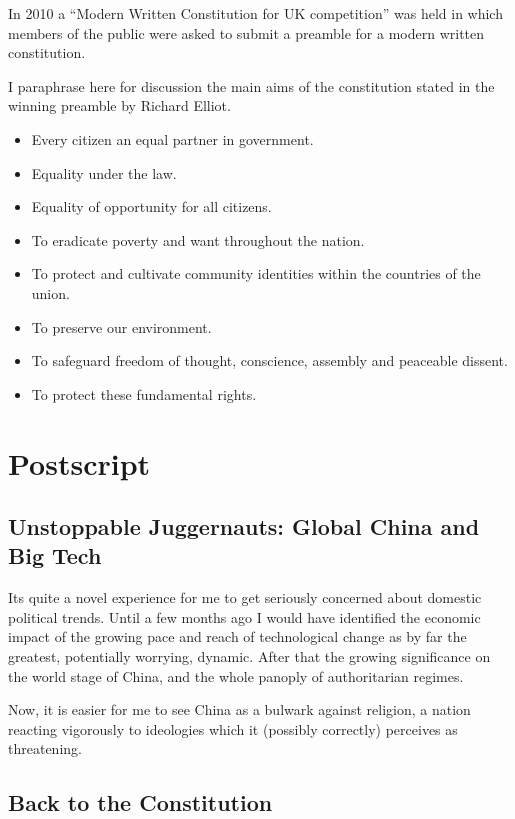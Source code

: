 \documentclass[14pt,titlepage]{extarticle}
\begin{document}
In 2010 a ``Modern Written Constitution for UK competition'' was held in which members of the public were asked to submit a preamble for a modern written constitution.

I paraphrase here for discussion the main aims of the constitution stated in the winning preamble by Richard Elliot.

\begin{itemize}
\item Every citizen an equal partner in government.
\item Equality under the law.
\item Equality of opportunity for all citizens.
\item To eradicate poverty and want throughout the nation.
\item To protect and cultivate community identities within the countries of the union.
\item To preserve our environment.
\item To safeguard freedom of thought, conscience, assembly and peaceable dissent.
\item To protect these fundamental rights.
\end{itemize}

\section{Postscript}

\subsection{Unstoppable Juggernauts: Global China and Big Tech}

Its quite a novel experience for me to get seriously concerned about domestic political trends.
Until a few months ago I would have identified the economic impact of the growing pace and reach of technological change as by far the greatest, potentially worrying, dynamic.
After that the growing significance on the world stage of China, and the whole panoply of authoritarian regimes.

Now, it is easier for me to see China as a bulwark against religion, a nation reacting vigorously to ideologies which it (possibly correctly) perceives as threatening.

\subsection{Back to the Constitution}
\end{document}
